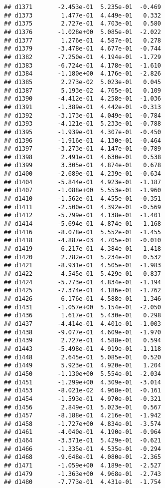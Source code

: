 \documentclass[
]{article}
\begin{document}
\begin{verbatim}
## d1371       -2.453e-01  5.235e-01  -0.469
## d1373        1.477e-01  4.449e-01   0.332
## d1375        2.727e-01  4.703e-01   0.580
## d1376       -1.028e+00  5.085e-01  -2.022
## d1377        1.276e-01  4.587e-01   0.278
## d1379       -3.478e-01  4.677e-01  -0.744
## d1382       -7.250e-01  4.194e-01  -1.729
## d1383       -6.724e-01  4.178e-01  -1.610
## d1384       -1.180e+00  4.176e-01  -2.826
## d1385        2.273e-02  5.023e-01   0.045
## d1387        5.193e-02  4.765e-01   0.109
## d1390       -4.412e-01  4.258e-01  -1.036
## d1391       -1.389e-01  4.442e-01  -0.313
## d1392       -3.173e-01  4.049e-01  -0.784
## d1393       -4.121e-01  5.233e-01  -0.788
## d1395       -1.939e-01  4.307e-01  -0.450
## d1396       -1.916e-01  4.130e-01  -0.464
## d1397       -3.273e-01  4.147e-01  -0.789
## d1398        2.491e-01  4.630e-01   0.538
## d1399        3.305e-01  4.874e-01   0.678
## d1400       -2.689e-01  4.239e-01  -0.634
## d1404       -5.844e-01  4.923e-01  -1.187
## d1407       -1.088e+00  5.553e-01  -1.960
## d1410       -1.562e-01  4.455e-01  -0.351
## d1411       -2.500e-01  4.392e-01  -0.569
## d1412       -5.799e-01  4.138e-01  -1.401
## d1414       -5.694e-01  4.874e-01  -1.168
## d1416       -8.078e-01  5.552e-01  -1.455
## d1418       -4.887e-03  4.705e-01  -0.010
## d1419       -6.217e-01  4.384e-01  -1.418
## d1420        2.782e-01  5.234e-01   0.532
## d1421       -8.931e-01  4.505e-01  -1.983
## d1422        4.545e-01  5.429e-01   0.837
## d1424       -5.773e-01  4.834e-01  -1.194
## d1425       -7.374e-01  4.186e-01  -1.762
## d1426        6.176e-01  4.588e-01   1.346
## d1431       -1.057e+00  5.154e-01  -2.050
## d1436        1.617e-01  5.430e-01   0.298
## d1437       -4.414e-01  4.401e-01  -1.003
## d1438       -9.077e-01  4.609e-01  -1.970
## d1439        2.727e-01  4.588e-01   0.594
## d1443       -5.498e-01  4.919e-01  -1.118
## d1448        2.645e-01  5.085e-01   0.520
## d1449        5.923e-01  4.920e-01   1.204
## d1450       -1.130e+00  5.554e-01  -2.034
## d1451       -1.299e+00  4.309e-01  -3.014
## d1453       -8.021e-02  4.968e-01  -0.161
## d1454       -1.593e-01  4.970e-01  -0.321
## d1456        2.849e-01  5.023e-01   0.567
## d1457       -8.188e-01  4.216e-01  -1.942
## d1458       -1.727e+00  4.834e-01  -3.574
## d1461       -4.040e-01  4.190e-01  -0.964
## d1464       -3.371e-01  5.429e-01  -0.621
## d1466       -1.335e-01  4.535e-01  -0.294
## d1468       -9.648e-01  4.080e-01  -2.365
## d1471       -1.059e+00  4.189e-01  -2.527
## d1479       -1.363e+00  4.968e-01  -2.743
## d1480       -7.773e-01  4.431e-01  -1.754

\end{verbatim}
\end{document}
